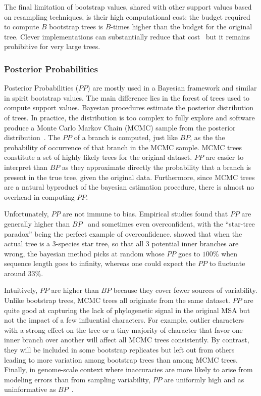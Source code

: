The final limitation of bootstrap values, shared with other support values based on resampling techniques, is their high computational cost: the budget required to compute $B$ bootstrap trees is $B$-times higher than the budget for the original tree. Clever implementations can substantially reduce that cost~\citep{Stamatakis2014} but it remains prohibitive for very large trees. 

\subsubsection{Posterior Probabilities} \label{sec:posterior-probabilities}

Posterior Probabilities ($PP$) are mostly used in a Bayesian framework and similar in spirit bootstrap values. The main difference lies in the forest of trees used to compute support values. Bayesian procedures estimate the posterior distribution of trees. In practice, the distribution is too complex to fully explore and software produce a Monte Carlo Markov Chain (MCMC) sample from the posterior distribution~\citep{Yang1997a}. The $PP$ of a branch is computed, just like $BP$, as the the probability of occurrence of that branch in the MCMC sample. MCMC trees constitute a set of highly likely trees for the original dataset. $PP$ are easier to interpret than $BP$ as they approximate directly the probability that a branch is present in the true tree, given the original data. Furthermore, since MCMC trees are a natural byproduct of the bayesian estimation procedure, there is almost no overhead in computing $PP$. 

Unfortunately, $PP$ are not immune to bias. Empirical studies found that $PP$ are generally higher than $BP$~\citep{Anisimova2011} and sometimes even overconfident, with the ``star-tree paradox'' \citep{Yang2007} being the perfect example of overconfidence. \citet{Yang2007} showed that when the actual tree is a 3-species star tree, so that all $3$ potential inner branches are wrong, the bayesian method picks at random whose $PP$ goes to $100$\% when sequence length goes to infinity, whereas one could expect the $PP$ to fluctuate around $33$\%. 

Intuitively, $PP$ are higher than $BP$ because they cover fewer sources of variability. Unlike bootstrap trees, MCMC trees all originate from the same dataset. $PP$ are quite good at capturing the lack of phylogenetic signal in the original MSA but not the impact of a few influential characters. For example, outlier characters with a strong effect on the tree or a tiny majority of character that favor one inner branch over another will affect all MCMC trees consistently. By contrast, they will be included in some bootstrap replicates but left out from others leading to more variation among bootstrap trees than among MCMC trees. Finally, in genome-scale context where inaccuracies are more likely to arise from modeling errors than from sampling variability, $PP$ are uniformly high and as uninformative as $BP$~\citep{Philippe2011, Kumar2012}.

